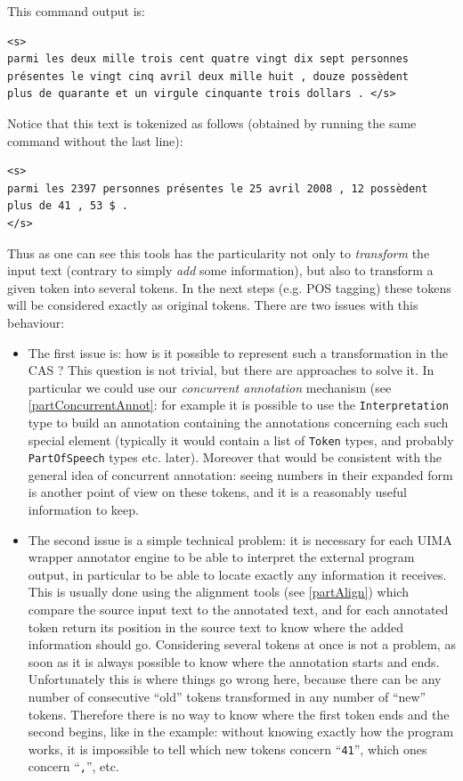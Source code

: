 \documentclass{article}
\begin{document}
This command output is:

\begin{verbatim}
<s>
parmi les deux mille trois cent quatre vingt dix sept personnes
présentes le vingt cinq avril deux mille huit , douze possèdent
plus de quarante et un virgule cinquante trois dollars . </s>
\end{verbatim}

Notice that this text is tokenized as follows (obtained by running the same command without the last line):

\begin{verbatim}
<s>
parmi les 2397 personnes présentes le 25 avril 2008 , 12 possèdent
plus de 41 , 53 $ .
</s>
\end{verbatim}

Thus as one can see this tools has the particularity not only to {\em transform} the input text (contrary to simply {\em add} some information), but also to transform a given token into several tokens. In the next steps (e.g. POS tagging) these tokens will be considered exactly as original tokens. There are two issues with this behaviour:

\begin{itemize}
\item The first issue is: how is it possible to represent such a transformation in the CAS ? This question is not trivial, but there are approaches to solve it. In particular we could use our {\em concurrent annotation} mechanism (see \ref{partConcurrentAnnot}: for example it is possible to use the {\tt Interpretation} type to build an annotation containing the annotations concerning each such special element (typically it would contain a list of {\tt Token} types, and probably {\tt PartOfSpeech} types etc. later). Moreover that would be consistent with the general idea of concurrent annotation: seeing numbers in their expanded form is another point of view on these tokens, and it is a reasonably useful information to keep.
\item The second issue is a simple technical problem: it is necessary for each UIMA wrapper annotator engine to be able to interpret the external program output, in particular to be able to locate exactly any information it receives. This is usually done using the alignment tools (see \ref{partAlign}) which compare the source input text to the annotated text, and for each annotated token return its position in the source text to know where the added information should go. Considering several tokens at once is not a problem, as soon as it is always possible to know where the annotation starts and ends. Unfortunately this is where things go wrong here, because there can be any number of consecutive ``old'' tokens transformed in any number of ``new'' tokens. Therefore there is no way to know where the first token ends and the second begins, like in the example: without knowing exactly how the program works, it is impossible to tell which new tokens concern ``{\tt 41}'', which ones concern ``{\tt ,}'', etc. 
\end{itemize}
\end{document}
